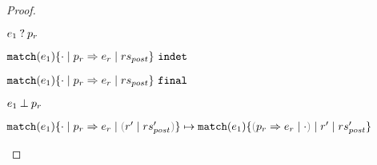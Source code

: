 \begin{proof}
\begin{byCases}
\begin{byCases}
\begin{byCases}
    \item[\text{Scrutinee may matches pattern}]
      \begin{pfsteps*}
      \item $e_1 \mathbin{?} p_r$  
      \item $\mathtt{match}(e_1) \{\cdot \mid p_r \Rightarrow e_r \mid rs_{post}\} ~\mathtt{indet}$  
      \item $\mathtt{match}(e_1) \{\cdot \mid p_r \Rightarrow e_r \mid rs_{post}\} ~\mathtt{final}$ 
      \end{pfsteps*}

    \item[\text{Scrutinee doesn't matche pattern}]
      \begin{pfsteps*}
      \item $e_1 \mathbin{\bot} p_r$  
      \item $\hlongtrans{\hmatch{e_1}{\zruls{\cdot}{\hrul{p_r}{e_r}}{\hrulesP{r'}{rs_{post}'}}}}{\hmatch{e_1}{\zruls{\hrulesP{\hrul{p_r}{e_r}}{\cdot}}{r'}{rs_{post}'}}}$ 
      \end{pfsteps*}
      \end{byCases}
  \end{byCases}
\end{byCases}
\end{proof}

